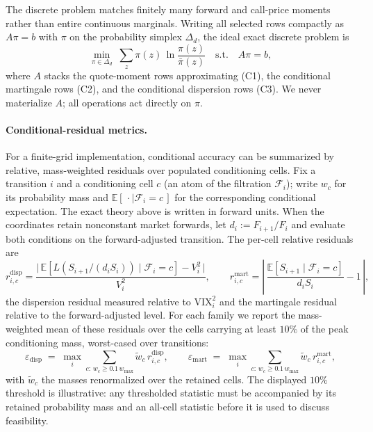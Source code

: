 \documentclass{article}
\newcommand{\cF}{\mathcal{F}}
\newcommand{\Embb}{\mathbb{E}}
\newcommand{\edisp}{\varepsilon_{\mathrm{disp}}}
\newcommand{\emart}{\varepsilon_{\mathrm{mart}}}
\begin{document}
The discrete problem matches finitely many forward and call-price moments rather than entire continuous marginals.
Writing all selected rows compactly as $A\pi=b$ with $\pi$ on the probability simplex $\Delta_d$, the ideal exact discrete problem is
\begin{equation}\label{eq:Pm}
    \min_{\pi\in\Delta_d}\; \sum_{z} \pi(z)\,\ln\frac{\pi(z)}{\bar\pi(z)}
    \quad\text{s.t.}\quad A\pi = b,
\end{equation}
where $A$ stacks the quote-moment rows approximating (C1), the conditional martingale rows (C2), and the conditional dispersion rows (C3).
We never materialize $A$; all operations act directly on $\pi$.

\paragraph{Conditional-residual metrics.} For a finite-grid implementation, conditional accuracy can be summarized by relative, mass-weighted residuals over populated conditioning cells.
Fix a transition $i$ and a conditioning cell $c$ (an atom of the filtration $\cF_i$); write $w_c$ for its probability mass and $\Embb[\,\cdot\mid\cF_i{=}c\,]$ for the corresponding conditional expectation.
The exact theory above is written in forward units.
When the coordinates retain nonconstant market forwards, let $d_i:=F_{i+1}/F_i$ and evaluate both conditions on the forward-adjusted transition.
The per-cell relative residuals are
\begin{equation}\label{eq:rel_residuals}
    r^{\mathrm{disp}}_{i,c} = \frac{\bigl|\,\Embb[L(S_{i+1}/(d_iS_i))\mid\cF_i{=}c] - V_i^2\,\bigr|}{V_i^2},
    \qquad
    r^{\mathrm{mart}}_{i,c} = \left|\,\frac{\Embb[S_{i+1}\mid\cF_i{=}c]}{d_iS_i} - 1\,\right|,
\end{equation}
the dispersion residual measured relative to $\mathrm{VIX}_i^2$ and the martingale residual relative to the forward-adjusted level.
For each family we report the mass-weighted mean of these residuals over the cells carrying at least $10\%$ of the peak conditioning mass, worst-cased over transitions:
\begin{equation}\label{eq:massw}
    \edisp \;=\; \max_i \!\!\sum_{c:\,w_c\ge 0.1\,w_{\max}}\!\! \tilde w_c\, r^{\mathrm{disp}}_{i,c},
    \qquad
    \emart \;=\; \max_i \!\!\sum_{c:\,w_c\ge 0.1\,w_{\max}}\!\! \tilde w_c\, r^{\mathrm{mart}}_{i,c},
\end{equation}
with $\tilde w_c$ the masses renormalized over the retained cells.
The displayed $10\%$ threshold is illustrative: any thresholded statistic must be accompanied by its retained probability mass and an all-cell statistic before it is used to discuss feasibility.
\end{document}
